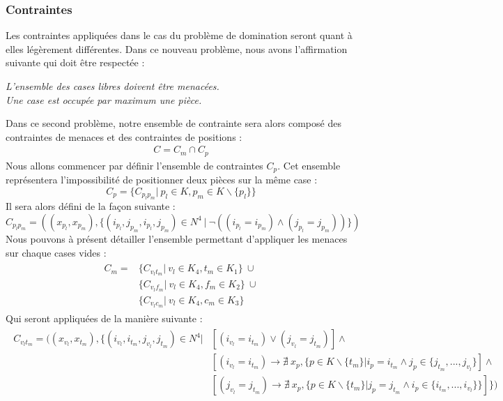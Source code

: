 \documentclass[a4paper]{article}
\begin{document}
\subsubsection{Contraintes}
Les contraintes appliquées dans le cas du problème de domination seront quant à elles légèrement différentes. Dans ce nouveau problème, nous avons l'affirmation suivante qui doit être respectée :
\begin{center}
\textit{L'ensemble des cases libres doivent être menacées.} \vspace{0.1cm} \\
\textit{Une case est occupée par maximum une pièce.}
\end{center}
Dans ce second problème, notre ensemble de contrainte sera alors composé des contraintes de menaces et des contraintes de positions : 
\begin{align*}
C = C_m \cap C_p
\end{align*}
Nous allons commencer par définir l'ensemble de contraintes $C_p$. Cet ensemble représentera l'impossibilité de positionner deux pièces sur la même case : 
\begin{equation*}
C_p = \{ C_{p_lp_m} | \  p_l \in K, p_m \in K \backslash \{ p_l \} \}
\end{equation*}
Il sera alors défini de la façon suivante : 
\begin{equation*}
C_{p_lp_m} = ((x_{p_l},x_{p_m}), \{ (i_{p_l},j_{p_m},i_{p_l},j_{p_m}) \in N^4 \ | \ \neg((i_{p_l} = i_{p_m}) \wedge (j_{p_l} = j_{p_m})) \})
\end{equation*}
Nous pouvons à présent détailler l'ensemble permettant d'appliquer les menaces sur chaque cases vides : 
\begin{align*}
\begin{split}
C_m ={} & \{ C_{v_lt_m} | \ v_l \in K_4, t_m \in K_1 \} \ \cup \\
	      & \{ C_{v_lf_m} | \ v_l \in K_4, f_m \in K_2 \} \ \cup \\
	      & \{ C_{v_lc_m} | \ v_l \in K_4, c_m \in K_3 \}
\end{split}
\end{align*}
Qui seront appliquées de la manière suivante : 
\begin{align*}
\begin{split}
C_{v_lt_m} = ( (x_{v_l},x_{t_m}), \{ (i_{v_l},i_{t_m},j_{v_l},j_{t_m}) \in N^4 | &  [ (i_{v_l} = i_{t_m}) \vee(j_{v_l} = j_{t_m}) ]\wedge \\
&[(i_{v_l} = i_{t_m}) \rightarrow \nexists \ x_p, \{ p \in K \backslash \{t_m\} | i_{p} = i_{t_m} \wedge j_p \in \{ j_{t_m},...,j_{v_l} \}] \wedge \\
& [(j_{v_l} = j_{t_m}) \rightarrow \nexists \ x_p, \{ p \in K \backslash \{t_m\} | j_p = j_{t_m}  \wedge i_p \in \{ i_{t_m},...,i_{v_l} \}\}  ]  \} )
\end{split}
\end{align*}
\end{document}
